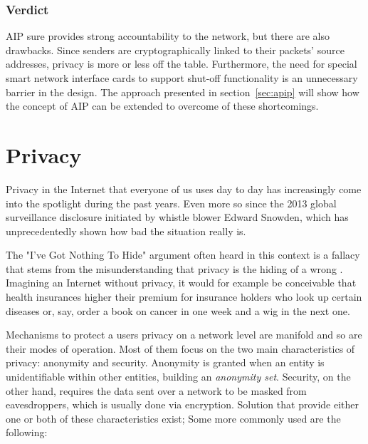 \documentclass{acm_proc_article-sp}
\begin{document}
\subsubsection{Verdict}
AIP sure provides strong accountability to the network, but there are also drawbacks. Since senders are cryptographically linked to their packets' source addresses, privacy is more or less off the table. Furthermore, the need for special smart network interface cards to support shut-off functionality is an unnecessary barrier in the design. The approach presented in section~\ref{sec:apip} will show how the concept of AIP can be extended to overcome of these shortcomings.


\section{Privacy}
\label{sec:priv}
Privacy in the Internet that everyone of us uses day to day has increasingly come into the spotlight during the past years. Even more so since the 2013 global surveillance disclosure initiated by whistle blower Edward Snowden, which has unprecedentedly shown how bad the situation really is.

The "I've Got Nothing To Hide" argument often heard in this context is a fallacy that stems from the misunderstanding that privacy is the hiding of a wrong \cite{solove}. Imagining an Internet without privacy, it would for example be conceivable that health insurances higher their premium for insurance holders who look up certain diseases or, say, order a book on cancer in one week and a wig in the next one.

Mechanisms to protect a users privacy on a network level are manifold and so are their modes of operation. Most of them focus on the two main characteristics of privacy: anonymity and security. Anonymity is granted when an entity is unidentifiable within other entities, building an \emph{anonymity set}. Security, on the other hand, requires the data sent over a network to be masked from eavesdroppers, which is usually done via encryption. Solution that provide either one or both of these characteristics exist; Some more commonly used are the following:
\end{document}

